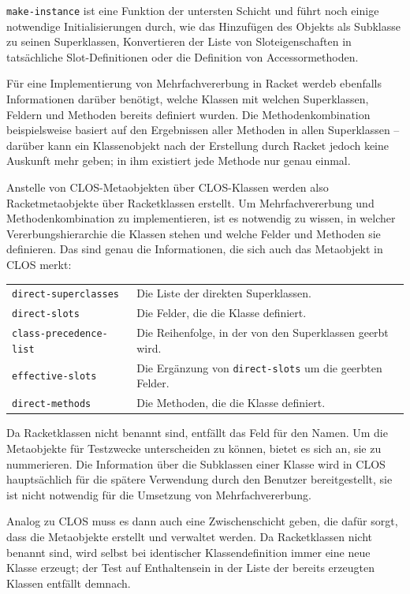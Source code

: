 \texttt{make-instance} ist eine Funktion der untersten Schicht und führt noch einige notwendige Initialisierungen durch, wie das Hinzufügen des Objekts als Subklasse zu seinen Superklassen, Konvertieren der Liste von Sloteigenschaften in tatsächliche Slot-Definitionen oder die Definition von Accessormethoden. 

Für eine Implementierung von Mehrfachvererbung in Racket werdeb ebenfalls Informationen darüber benötigt, welche Klassen mit welchen Superklassen, Feldern und Methoden bereits definiert wurden. Die Methodenkombination beispielsweise basiert auf den Ergebnissen aller Methoden in allen Superklassen -- darüber kann ein Klassenobjekt nach der Erstellung durch Racket jedoch keine Auskunft mehr geben; in ihm existiert jede Methode nur genau einmal.

Anstelle von CLOS-Metaobjekten über CLOS-Klassen werden also Racketmetaobjekte über Racketklassen erstellt. Um Mehrfachvererbung und Methodenkombination zu implementieren, ist es notwendig zu wissen, in welcher Vererbungshierarchie die Klassen stehen und welche Felder und Methoden sie definieren. Das sind genau die Informationen, die sich auch das Metaobjekt in CLOS merkt:

\begin{tabular}{p{5cm}p{9cm}}
 \texttt{direct-superclasses} & Die Liste der direkten Superklassen. \\
 \texttt{direct-slots} & Die Felder, die die Klasse definiert. \\
 \texttt{class-precedence-list} & Die Reihenfolge, in der von den Superklassen geerbt wird.\\
 \texttt{effective-slots} & Die Ergänzung von \texttt{direct-slots} um die geerbten Felder. \\
 \texttt{direct-methods} & Die Methoden, die die Klasse definiert.
\end{tabular}

Da Racketklassen nicht benannt sind, entfällt das Feld für den Namen. Um die Metaobjekte für Testzwecke unterscheiden zu können, bietet es sich an, sie zu nummerieren. Die Information über die Subklassen einer Klasse wird in CLOS hauptsächlich für die spätere Verwendung durch den Benutzer bereitgestellt, sie ist nicht notwendig für die Umsetzung von Mehrfachvererbung. 

Analog zu CLOS muss es dann auch eine Zwischenschicht geben, die dafür sorgt, dass die Metaobjekte erstellt und verwaltet werden. Da Racketklassen nicht benannt sind, wird selbst bei identischer Klassendefinition immer eine neue Klasse erzeugt; der Test auf Enthaltensein in der Liste der bereits erzeugten Klassen entfällt demnach.

